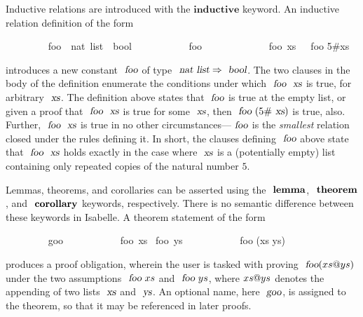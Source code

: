 \documentclass[acmlarge,review,anonymous]{acmart}\settopmatter{printfolios=true}
\begin{document}
Inductive relations are introduced with the $\mathbf{inductive}$ keyword.
An inductive relation definition of the form
\\
\begin{isabellebody}
\ \ \ \ \ \ \ \  foo\ {\isacharcolon}{\isacharcolon}\ {\isachardoublequoteopen}nat\ list\ {\isasymRightarrow}\ bool{\isachardoublequoteclose}\ \isanewline
\ \ \ \ \ \ \ \ \ \ {\isachardoublequoteopen}foo\ {\isacharbrackleft}{\isacharbrackright}{\isachardoublequoteclose}\ {\isacharbar}\isanewline
\ \ \ \ \ \ \ \ \ \ {\isachardoublequoteopen}{\isasymlbrakk}\ foo\ xs\ {\isasymrbrakk}\ {\isasymLongrightarrow}\ foo {\isacharparenleft}5\#xs{\isacharparenright}{\isachardoublequoteclose}
\end{isabellebody}
\vspace{\baselineskip}
\noindent
introduces a new constant $\isa{foo}$ of type $\isa{nat list} \Rightarrow \isa{bool}$.
The two clauses in the body of the definition enumerate the conditions under which $\isa{foo}\ \isa{xs}$ is true, for arbitrary $\isa{xs}$.
The definition above states that $\isa{foo}$ is true at the empty list, or given a proof that $\isa{foo}\ \isa{xs}$ is true for some $\isa{xs}$, then $\isa{foo}\ (5\#\isa{xs})$ is true, also.
Further, $\isa{foo}\ \isa{xs}$ is true in no other circumstances---$\isa{foo}$ is the \emph{smallest} relation closed under the rules defining it.
In short, the clauses defining $\isa{foo}$ above state that $\isa{foo}\ \isa{xs}$ holds exactly in the case where $\isa{xs}$ is a (potentially empty) list containing only repeated copies of the natural number $5$.

Lemmas, theorems, and corollaries can be asserted using the $\isacommand{lemma}$, $\isacommand{theorem}$, and $\isacommand{corollary}$ keywords, respectively.
There is no semantic difference between these keywords in Isabelle.
A theorem statement of the form
\\
\begin{isabellebody}
\ \ \ \ \ \ \ \  goo{\isacharcolon}\isanewline
\ \ \ \ \ \ \ \ \ \ \ foo\ xs \ foo\ ys \isanewline
\ \ \ \ \ \ \ \ \ \ \ foo (xs \isacharat ys)
\end{isabellebody}
\vspace{\baselineskip}
\noindent
produces a proof obligation, wherein the user is tasked with proving $\isa{foo} (xs \isacharat ys)$ under the two assumptions $\isa{foo}\ xs$ and $\isa{foo}\ ys$, where $xs \emph{$@$} ys$ denotes the appending of two lists $\isa{xs}$ and $\isa{ys}$.
An optional name, here $\isa{goo}$, is assigned to the theorem, so that it may be referenced in later proofs.
\end{document}
